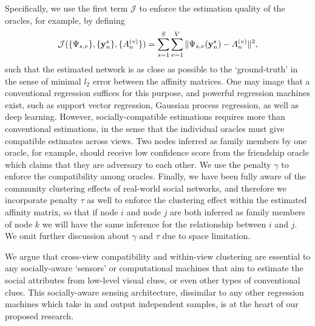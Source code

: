 Specifically, we use the first term $\mathcal{J}$ to enforce the estimation quality of the oracles, for example, by defining
\begin{equation}\label{eq:L2error}
\mathcal{J}(\{\Psi_{s,v}\}, \{{\bf y}^{s}_n\}, \{A^{(v)}_n\})=\sum_{s=1}^{S}\sum_{v=1}^{V}\|\Psi_{s,v}({\bf y}^{s}_n)-A^{(v)}_n\|^{2},
 \end{equation}
such that the estimated network is as close as possible to the `ground-truth' in the sense of minimal $l_2$ error between the affinity matrices. One may image that a conventional regression suffices for this purpose, and powerful regression machines exist, such as support vector regression, Gaussian process regression, as well as deep learning. However, socially-compatible estimations requires more than conventional estimations, in the sense that the individual oracles must give compatible estimates across views. Two nodes inferred as family members by one oracle, for example, should receive low confidence score from the friendship oracle which claims that they are adversary to each other. We use the penalty $\gamma$ to enforce the compatibility among oracles. Finally, we have been fully aware of the community clustering effects of real-world social networks, and therefore we incorporate penalty $\tau$ as well to enforce the clustering effect within the estimated affinity matrix, so that if node $i$ and node $j$ are both inferred as family members of node $k$ we will have the same inference for the relationship between $i$ and $j$. We omit further discussion about $\gamma$ and $\tau$ due to space limitation.


We argue that cross-view compatibility and within-view clustering are essential to any socially-aware `sensors' or computational machines that aim to estimate the social attributes from low-level visual clues, or even other types of conventional clues. This socially-aware sensing architecture, dissimilar to any other regression machines which take in and output independent samples, is at the heart of our proposed research.

